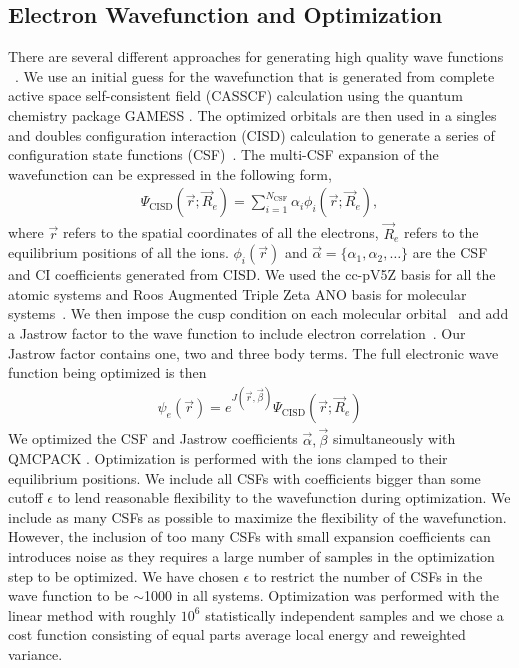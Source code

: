 \documentclass[pra,superscriptaddress,groupedaddress,twocolumn]{revtex4}
\begin{document}
\subsection{Electron Wavefunction and Optimization}
There are several different approaches for generating high quality wave functions ~\cite{Umrigar_Alleviation,Toulouse_Bench, Brown_Bench,Seth_Bench}. We use an initial guess for the wavefunction that is generated from complete active space self-consistent field (CASSCF) \cite{Chaban_MCSCF,Szabo} calculation using the quantum chemistry package GAMESS \cite{GAMESS}. The optimized orbitals are then used in a singles and doubles configuration interaction (CISD) calculation to generate a series of configuration state functions (CSF)~\cite{Clark_Bench}. The multi-CSF expansion of the wavefunction can be expressed in the following form,
\begin{align}
\Psi_{\text{CISD}}(\vec{r};\vec{R}_e)=\sum\limits_{i=1}^{N_{\text{CSF}}}\alpha_i\phi_i(\vec{r};\vec{R}_e), \label{eq:psi_gms}
\end{align}
where $\vec{r}$ refers to the spatial coordinates of all the electrons, $\vec{R}_e$ refers to the equilibrium positions of all the ions. $\phi_i(\vec{r})$ and $\vec{\alpha}=\{\alpha_1,\alpha_2,\dots\}$ are the CSF and CI coefficients generated from CISD. We used the cc-pV5Z basis for all the atomic systems and Roos Augmented Triple Zeta ANO basis for molecular systems~\cite{dunning,roos}. We then impose the cusp condition on each molecular orbital~\cite{cusp} and add a Jastrow factor to the wave function to include electron correlation~\cite{Kato}. Our Jastrow factor contains one, two and three body terms. The full electronic wave function being optimized is then
\begin{align}
\psi_e(\vec{r})=e^{J(\vec{r},\vec{\beta})}\Psi_{\text{CISD}}(\vec{r};\vec{R}_e)\label{eq:psie}
\end{align}
We optimized the CSF and Jastrow coefficients $\vec{\alpha},\vec{\beta}$ simultaneously with QMCPACK \cite{QMCPACK}. Optimization is performed with the ions clamped to their equilibrium positions. We include all CSFs with coefficients bigger than some cutoff $\epsilon$ to lend reasonable flexibility to the wavefunction during optimization. We include as many CSFs as possible to maximize the flexibility of the wavefunction. However, the inclusion of too many CSFs with small expansion coefficients can introduces noise as they requires a large number of samples in the optimization step to be optimized. We have chosen $\epsilon$ to restrict the number of CSFs in the wave function to be $\sim$1000 in all systems. Optimization was performed with the linear method with roughly $10^6$ statistically independent samples and we chose a cost function consisting of equal parts average local energy and reweighted variance.
\end{document}
